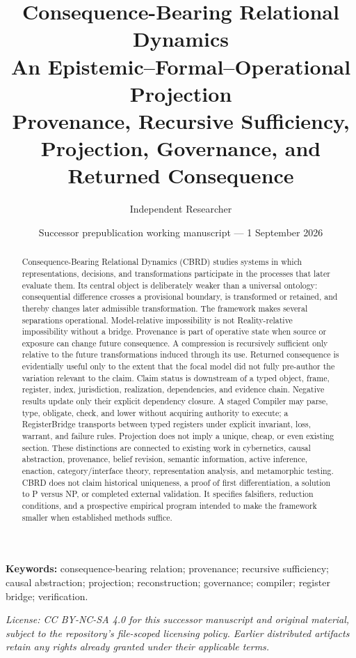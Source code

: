 \documentclass[11pt]{article}
\title{\textbf{Consequence-Bearing Relational Dynamics}\\
\large An Epistemic--Formal--Operational Projection\\
\normalsize Provenance, Recursive Sufficiency, Projection, Governance, and Returned Consequence}
\author{Independent Researcher}
\date{Successor prepublication working manuscript --- 1 September 2026}
\begin{document}
\maketitle

\begin{abstract}
Consequence-Bearing Relational Dynamics (CBRD) studies systems in which representations, decisions, and transformations participate in the processes that later evaluate them. Its central object is deliberately weaker than a universal ontology: consequential difference crosses a provisional boundary, is transformed or retained, and thereby changes later admissible transformation. The framework makes several separations operational. Model-relative impossibility is not Reality-relative impossibility without a bridge. Provenance is part of operative state when source or exposure can change future consequence. A compression is recursively sufficient only relative to the future transformations induced through its use. Returned consequence is evidentially useful only to the extent that the focal model did not fully pre-author the variation relevant to the claim. Claim status is downstream of a typed object, frame, register, index, jurisdiction, realization, dependencies, and evidence chain. Negative results update only their explicit dependency closure. A staged Compiler may parse, type, obligate, check, and lower without acquiring authority to execute; a RegisterBridge transports between typed registers under explicit invariant, loss, warrant, and failure rules. Projection does not imply a unique, cheap, or even existing section. These distinctions are connected to existing work in cybernetics, causal abstraction, provenance, belief revision, semantic information, active inference, enaction, category/interface theory, representation analysis, and metamorphic testing. CBRD does not claim historical uniqueness, a proof of first differentiation, a solution to P versus NP, or completed external validation. It specifies falsifiers, reduction conditions, and a prospective empirical program intended to make the framework smaller when established methods suffice.
\end{abstract}

\noindent\textbf{Keywords:} consequence-bearing relation; provenance; recursive sufficiency; causal abstraction; projection; reconstruction; governance; compiler; register bridge; verification.

\medskip
\noindent\small\textit{License: CC BY-NC-SA 4.0 for this successor manuscript and original material, subject to the repository's file-scoped licensing policy. Earlier distributed artifacts retain any rights already granted under their applicable terms.}\normalsize

\tableofcontents
\newpage







\end{document}
